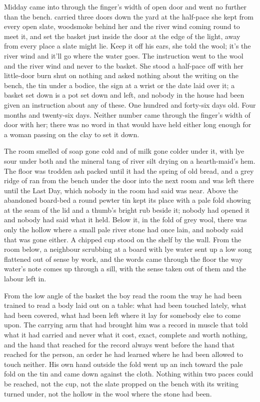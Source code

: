 
Midday came into  through the finger's width of open door and went no further than the bench.  carried  three doors down the yard at the half-pace she kept from every open slate, woodsmoke behind her and the river wind coming round to meet it, and set the basket just inside the door at the edge of the light, away from every place a slate might lie. Keep it off his ears, she told the wool; it's the river wind and it'll go where the water goes. The instruction went to the wool and the river wind and never to the basket. She stood a half-pace off with her little-door burn shut on nothing and asked nothing about the writing on the bench, the tin under a bodice, the sign at a wrist or the date laid over it; a basket set down is a pot set down and left, and nobody in the house had been given an instruction about any of these. One hundred and forty-six days old. Four months and twenty-six days. Neither number came through the finger's width of door with her; there was no word in  that would have held either long enough for a woman passing on the clay to set it down.

The room smelled of soap gone cold and of milk gone colder under it, with lye sour under both and the mineral tang of river silt drying on a hearth-maid's hem. The floor was trodden ash packed until it had the spring of old bread, and a grey ridge of  ran from the bench under the door into the next room and was left there until the Last Day, which nobody in the room had said was near. Above the abandoned board-bed a round pewter tin kept its place with a pale fold showing at the seam of the lid and a thumb's bright rub beside it; nobody had opened it and nobody had said what it held. Below it, in the fold of grey wool, there was only the hollow where a small pale river stone had once lain, and nobody said that was gone either. A chipped cup stood on the shelf by the wall. From the room below, a neighbour scrubbing at a board with lye water sent up a low song flattened out of sense by work, and the words came through the floor the way water's note comes up through a sill, with the sense taken out of them and the labour left in.

From the low angle of the basket the boy read the room the way he had been trained to read a body laid out on a table: what had been touched lately, what had been covered, what had been left where it lay for somebody else to come upon. The carrying arm that had brought him was a record in muscle that told what it had carried and never what it cost, exact, complete and worth nothing, and the hand that reached for the record always went before the hand that reached for the person, an order he had learned where he had been allowed to touch neither. His own hand outside the fold went up an inch toward the pale fold on the tin and came down against the cloth. Nothing within two paces could be reached, not the cup, not the slate propped on the bench with its writing turned under, not the hollow in the wool where the stone had been.

